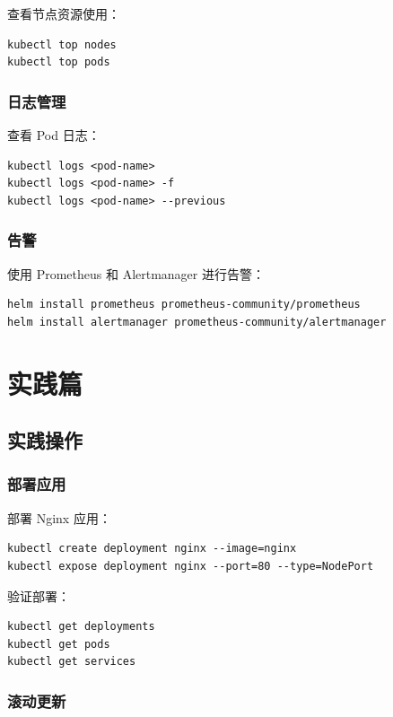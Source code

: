 \documentclass[12pt,UTF8]{ctexbook}
\begin{document}
查看节点资源使用：
\begin{lstlisting}
kubectl top nodes
kubectl top pods
\end{lstlisting}

\section{日志管理}
\label{sec:logging}

查看 Pod 日志：
\begin{lstlisting}
kubectl logs <pod-name>
kubectl logs <pod-name> -f
kubectl logs <pod-name> --previous
\end{lstlisting}

\section{告警}
\label{sec:alerting}

使用 Prometheus 和 Alertmanager 进行告警：

\begin{lstlisting}
helm install prometheus prometheus-community/prometheus
helm install alertmanager prometheus-community/alertmanager
\end{lstlisting}

\part{实践篇}

\chapter{实践操作}
\label{chap:practice}

\section{部署应用}
\label{sec:deploy_app}

部署 Nginx 应用：

\begin{lstlisting}
kubectl create deployment nginx --image=nginx
kubectl expose deployment nginx --port=80 --type=NodePort
\end{lstlisting}

验证部署：
\begin{lstlisting}
kubectl get deployments
kubectl get pods
kubectl get services
\end{lstlisting}

\section{滚动更新}
\label{sec:rolling_update}
\end{document}
